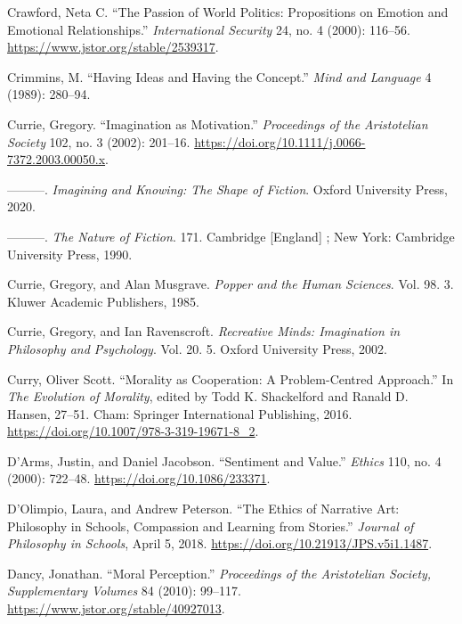 \documentclass[phdthesis,12pt,final]{wuthesis}
\newlength{\cslhangindent}
\newenvironment{CSLReferences}[2] %
{\begin{list}{}{%
	\setlength{\itemindent}{0pt}
	\setlength{\leftmargin}{0pt}
	\setlength{\parsep}{0pt}
	\ifodd #1
	\setlength{\leftmargin}{\cslhangindent}
	\setlength{\itemindent}{-1\cslhangindent}
	\fi
	\setlength{\itemsep}{#2\baselineskip}}}
{\end{list}}
\theoremstyle{definition}
\theoremstyle{definition}
\theoremstyle{definition}
\theoremstyle{definition}
\theoremstyle{remark}
\begin{document}
\begin{CSLReferences}{1}{0}
Crawford, Neta C. {``The Passion of World Politics: Propositions on Emotion and Emotional Relationships.''} \emph{International Security} 24, no. 4 (2000): 116--56. \url{https://www.jstor.org/stable/2539317}.

Crimmins, M. {``Having Ideas and Having the Concept.''} \emph{Mind and Language} 4 (1989): 280--94.

Currie, Gregory. {``Imagination as Motivation.''} \emph{Proceedings of the Aristotelian Society} 102, no. 3 (2002): 201--16. \url{https://doi.org/10.1111/j.0066-7372.2003.00050.x}.

---------. \emph{Imagining and Knowing: The Shape of Fiction}. Oxford University Press, 2020.

---------. \emph{The Nature of Fiction}. 171. Cambridge {[}England{]} ; New York: Cambridge University Press, 1990.

Currie, Gregory, and Alan Musgrave. \emph{Popper and the Human Sciences}. Vol. 98. 3. Kluwer Academic Publishers, 1985.

Currie, Gregory, and Ian Ravenscroft. \emph{Recreative Minds: Imagination in Philosophy and Psychology}. Vol. 20. 5. Oxford University Press, 2002.

Curry, Oliver Scott. {``Morality as {Cooperation}: {A Problem-Centred Approach}.''} In \emph{The {Evolution} of {Morality}}, edited by Todd K. Shackelford and Ranald D. Hansen, 27--51. Cham: Springer International Publishing, 2016. \url{https://doi.org/10.1007/978-3-319-19671-8_2}.

D'Arms, Justin, and Daniel Jacobson. {``Sentiment and {Value}.''} \emph{Ethics} 110, no. 4 (2000): 722--48. \url{https://doi.org/10.1086/233371}.

D'Olimpio, Laura, and Andrew Peterson. {``The Ethics of Narrative Art: Philosophy in Schools, Compassion and Learning from Stories.''} \emph{Journal of Philosophy in Schools}, April 5, 2018. \url{https://doi.org/10.21913/JPS.v5i1.1487}.

Dancy, Jonathan. {``Moral {Perception}.''} \emph{Proceedings of the Aristotelian Society, Supplementary Volumes} 84 (2010): 99--117. \url{https://www.jstor.org/stable/40927013}.


\end{CSLReferences}
\end{document}
